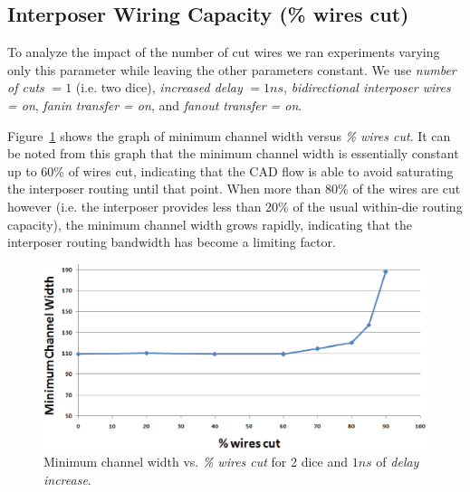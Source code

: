 \documentclass[journal]{IEEEtran}
\begin{document}
\subsection{Interposer Wiring Capacity (\% wires cut)}
\label{sec:resultsWiringCapacity}

To analyze the impact of the number of cut wires we ran experiments varying only this parameter while leaving the other parameters constant. We use \textit{number of cuts} $= 1$ (i.e. two dice), \textit{increased delay} $= 1ns$, \textit{bidirectional interposer wires = on}, \textit{fanin transfer = on}, and \textit{fanout transfer = on}.

Figure~\ref{fig:standard_minW} shows the graph of minimum channel width versus \textit{\% wires cut}. It can be noted from this graph that the minimum channel width is essentially constant up to 60\% of wires cut, indicating that the CAD flow is able to avoid saturating the interposer routing until that point. When more than 80\% of the wires are cut however (i.e. the interposer provides less than 20\% of the usual within-die routing capacity), the minimum channel width grows rapidly, indicating that the interposer routing bandwidth has become a limiting factor.

\begin{figure}[!htbp]
\centering
\includegraphics[width=\linewidth]{MinChW_3.eps}
\caption{Minimum channel width vs. \textit{\% wires cut} for 2 dice and $1ns$ of \textit{delay increase}.}
\label{fig:standard_minW}
\end{figure}
\end{document}
